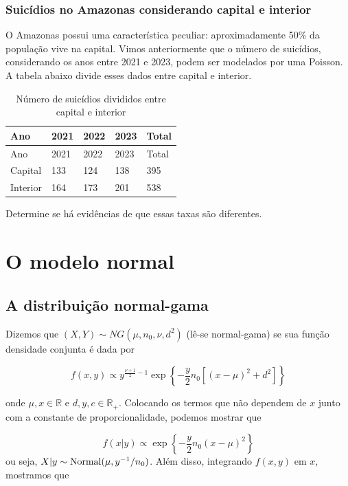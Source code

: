 \documentclass[
  letterpaper,
  DIV=11,
  numbers=noendperiod]{scrreprt}
\theoremstyle{plain}
\theoremstyle{definition}
\theoremstyle{definition}
\theoremstyle{remark}
\begin{document}
\subsection{Suicídios no Amazonas considerando capital e
interior}\label{suicuxeddios-no-amazonas-considerando-capital-e-interior}

O Amazonas possui uma característica peculiar: aproximadamente 50\% da
população vive na capital. Vimos anteriormente que o número de
suicídios, considerando os anos entre 2021 e 2023, podem ser modelados
por uma Poisson. A tabela abaixo divide esses dados entre capital e
interior.

\begin{longtable}[]{@{}lllll@{}}
\caption{Número de suicídios divididos entre capital e
interior}\tabularnewline
\toprule\noalign{}
Ano & 2021 & 2022 & 2023 & Total \\
\midrule\noalign{}
\endfirsthead
\toprule\noalign{}
Ano & 2021 & 2022 & 2023 & Total \\
\midrule\noalign{}
\endhead
\bottomrule\noalign{}
\endlastfoot
Capital & 133 & 124 & 138 & 395 \\
Interior & 164 & 173 & 201 & 538 \\
\end{longtable}

Determine se há evidências de que essas taxas são diferentes.


\chapter{O modelo normal}\label{o-modelo-normal}

\section{A distribuição
normal-gama}\label{a-distribuiuxe7uxe3o-normal-gama}

Dizemos que \((X,Y)\sim NG(\mu,n_0,\nu,d^2)\) (lê-se normal-gama) se sua
função densidade conjunta é dada por

\[f(x,y)\propto y^{\frac{\nu+1}{2}-1}\exp\left\{-\frac{y}{2}n_0\left[(x-\mu)^2 + d^2\right]\right\}\]

onde \(\mu,x\in\mathbb{R}\) e \(d,y,c\in\mathbb{R}_+\). Colocando os
termos que não dependem de \(x\) junto com a constante de
proporcionalidade, podemos mostrar que

\[f(x|y)\propto \exp\left\{-\frac{y}{2}n_0(x-\mu)^2\right\}\] ou seja,
\(X|y\sim\hbox{Normal}(\mu,y^{-1}/n_0)\). Além disso, integrando
\(f(x,y)\) em \(x\), mostramos que
\end{document}

